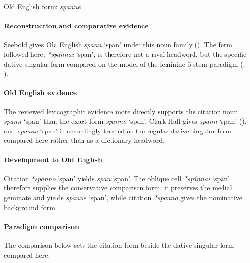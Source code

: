 \documentclass[
  british,
  a4paper,
]{article}
\providecommand{\Recon}[1]{\emph{*#1}}
\begin{document}
Old English form: \emph{spanne}

\paragraph{Reconstruction and comparative
evidence}\label{reconstruction-and-comparative-evidence-132}

Seebold gives Old English {\emph{spann}} `span' under this noun family
(). The form followed here,
\Recon{spánnai} `span', is therefore not a rival headword, but the
specific dative singular form compared on the model of the feminine
ō-stem paradigm (; ).

\paragraph{Old English evidence}\label{old-english-evidence-132}

The reviewed lexicographic evidence more directly supports the citation
noun {\emph{spann}} `span' than the exact form {\emph{spanne}} `span'.
Clark Hall gives {\emph{spann}} `span'
(), and
{\emph{spanne}} `span' is accordingly treated as the regular dative
singular form compared here rather than as a dictionary headword.

\paragraph{Development to Old
English}\label{development-to-old-english-132}

Citation \Recon{spannō} `span' yields {\emph{span}} `span'. The oblique
cell \Recon{spánnai} `span' therefore supplies the conservative
comparison form: it preserves the medial geminate and yields
{\emph{spanne}} `span', while citation \Recon{spannō} gives the
nominative background form.

\paragraph{Paradigm comparison}\label{paradigm-comparison-15}

The comparison below sets the citation form beside the dative singular
form compared here.
\end{document}
